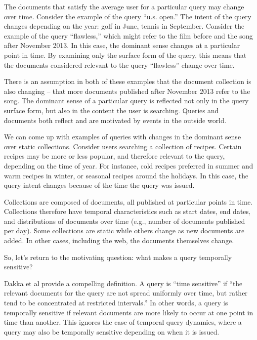 \documentclass{sig-alternate}
\begin{document}
The documents that satisfy the average user for a particular query may change over time.  Consider the example of the query ``u.s. open.'' The intent of the query changes depending on the year: golf in June, tennis in September.  Consider the example of the query ``flawless,'' which might refer to the film before and the song after November 2013. In this case, the dominant sense changes at a particular point in time. By examining only the surface form of the query, this means that the documents considered relevant to the query ``flawless'' change over time.  

There is an assumption in both of these examples that the document collection is also changing -- that more documents published after November 2013 refer to the song. The dominant sense of a particular query is reflected not only in the query surface form, but also in the content the user is searching.  Queries and documents both reflect and are motivated by events in the outside world.

We can come up with examples of queries with changes in the dominant sense over static collections.  Consider users searching a collection of recipes.  Certain recipes may be more or less popular, and therefore relevant to the query, depending on the time of year. For instance, cold recipes preferred in summer and warm recipes in winter, or seasonal recipes around the holidays. In this case, the query intent changes because of the time the query was issued. 

Collections are composed of documents, all published at particular points in time. Collections therefore have temporal characteristics such as start dates, end dates, and distributions of documents over time (e.g., number of documents published per day). Some collections are static while others change as new documents are added. In other cases, including the web, the documents themselves change.  

So, let's return to the motivating question: what makes a query temporally sensitive?

Dakka et al provide a compelling definition.  A query is ``time sensitive''  if  ``the relevant documents for the query are not spread uniformly over time, but rather tend to be concentrated at restricted intervals.'' In other words, a query is temporally sensitive if relevant documents are more likely to occur at one point in time than another.  This ignores the case of temporal query dynamics,  where a query may also be temporally sensitive depending on when it is issued.
\end{document}
